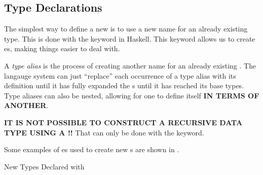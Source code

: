 \subsection{Type Declarations}\label{subsec:Type_Declarations}
The simplest way to define a new  is to use a new name for an already existing type.
This is done with the  keyword in Haskell.
This keyword allows us to create es, making things easier to deal with.

\begin{definition}\label{def:Type_Alias}
  A \emph{type alias} is the process of creating another name for an already existing .
  The langauge system can just ``replace'' each occurrence of a type alias with its definition until it has fully expanded the s until it has reached its base types.
  Type aliases can also be nested, allowing for one to define itself \textbf{IN TERMS OF ANOTHER}.

  \begin{remark}\label{rmk:Recursive_Type_Alias}
    \textbf{IT IS NOT POSSIBLE TO CONSTRUCT A RECURSIVE DATA TYPE USING A !!}
    That can only be done with the  keyword.
  \end{remark}
\end{definition}

Some examples of es used to create new s are shown in .

\begin{listing}[h!tbp]
\caption{New Types Declared with }
\label{lst:New_Type-Type}
\end{listing}



